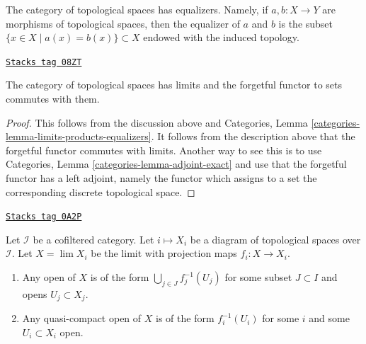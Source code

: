 \medskip\noindent
The category of topological spaces has equalizers. Namely, if
$a, b : X \to Y$ are morphisms of topological spaces, then the
equalizer of $a$ and $b$ is the subset $\{x \in X \mid a(x) = b(x)\} \subset X$
endowed with the induced topology.

\begin{lemma}[Limits]
\label{topology-lemma-limits}
\href{https://stacks.math.columbia.edu/tag/08ZT}{\texttt{Stacks tag 08ZT}}

The category of topological spaces has limits and the forgetful functor
to sets commutes with them.
\end{lemma}

\begin{proof}
This follows from the discussion above and
Categories, Lemma \ref{categories-lemma-limits-products-equalizers}.
It follows from the description above that the forgetful functor
commutes with limits. Another way to see this is to use
Categories, Lemma \ref{categories-lemma-adjoint-exact} and use that
the forgetful functor has a left adjoint, namely the functor which
assigns to a set the corresponding discrete topological space.
\end{proof}

\begin{lemma}
\label{topology-lemma-describe-limits}
\href{https://stacks.math.columbia.edu/tag/0A2P}{\texttt{Stacks tag 0A2P}}

Let $\mathcal{I}$ be a cofiltered category. Let $i \mapsto X_i$ be a diagram
of topological spaces over $\mathcal{I}$. Let $X = \lim X_i$ be the limit
with projection maps $f_i : X \to X_i$.
\begin{enumerate}
\item Any open of $X$ is of the form $\bigcup_{j \in J} f_j^{-1}(U_j)$
for some subset $J \subset I$ and opens $U_j \subset X_j$.
\item Any quasi-compact open of $X$ is of the form
$f_i^{-1}(U_i)$ for some $i$ and some $U_i \subset X_i$ open.
\end{enumerate}
\end{lemma}

